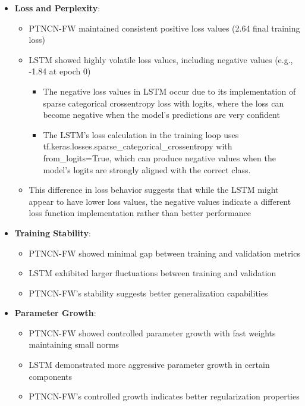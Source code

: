 \documentclass{article}
\begin{document}
\begin{itemize}
    \item \textbf{Loss and Perplexity}:
    \begin{itemize}
        \item PTNCN-FW maintained consistent positive loss values (2.64 final training loss)
        \item LSTM showed highly volatile loss values, including negative values (e.g., -1.84 at epoch 0)
        \begin{itemize}
            \item The negative loss values in LSTM occur due to its implementation of sparse categorical crossentropy loss with logits, where the loss can become negative when the model's predictions are very confident
        \end{itemize}
        \begin{itemize}
            \item The LSTM's loss calculation in the training loop uses tf.keras.losses.sparse\_categorical\_crossentropy with from\_logits=True, which can produce negative values when the model's logits are strongly aligned with the correct class.
        \end{itemize}
        \item This difference in loss behavior suggests that while the LSTM might appear to have lower loss values, the negative values indicate a different loss function implementation rather than better performance
    \end{itemize}

    \item \textbf{Training Stability}:
    \begin{itemize}
        \item PTNCN-FW showed minimal gap between training and validation metrics
        \item LSTM exhibited larger fluctuations between training and validation
        \item PTNCN-FW's stability suggests better generalization capabilities
    \end{itemize}

    \item \textbf{Parameter Growth}:
    \begin{itemize}
        \item PTNCN-FW showed controlled parameter growth with fast weights maintaining small norms
        \item LSTM demonstrated more aggressive parameter growth in certain components
        \item PTNCN-FW's controlled growth indicates better regularization properties
    \end{itemize}
\end{itemize}
\end{document}
